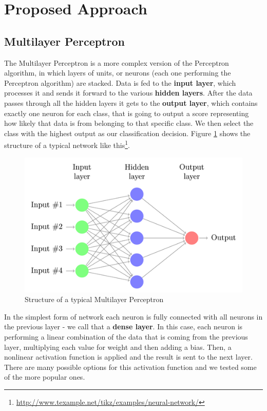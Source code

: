 \documentclass[conference]{IEEEtran}
\begin{document}
\section{Proposed Approach}
\label{section:proposed_approach}

\subsection{Multilayer Perceptron}

The Multilayer Perceptron is a more complex version of the Perceptron algorithm, in which layers of units, or neurons (each one performing the Perceptron algorithm) are stacked. Data is fed to the \textbf{input layer}, which processes it and sends it forward to the various \textbf{hidden layers}. After the data passes through all the hidden layers it gets to the \textbf{output layer}, which contains exactly one neuron for each class, that is going to output a score representing how likely that data is from belonging to that specific class. We then select the class with the highest output as our classification decision. Figure \ref{fig:mlp} shows the structure of a typical network like this\footnote{\url{http://www.texample.net/tikz/examples/neural-network/}}.

\begin{figure}[]
\centering
\includegraphics[scale = 0.45]{figs/mlp.png}
\caption{Structure of a typical Multilayer Perceptron}
\label{fig:mlp}
\end{figure}

In the simplest form of network each neuron is fully connected with all neurons in the previous layer - we call that a \textbf{dense layer}. In this case, each neuron is performing a linear combination of the data that is coming from the previous layer, multiplying each value for weight and then adding a bias. Then, a nonlinear activation function is applied and the result is sent to the next layer. There are many possible options for this activation function and we tested some of the more popular ones.
\end{document}
